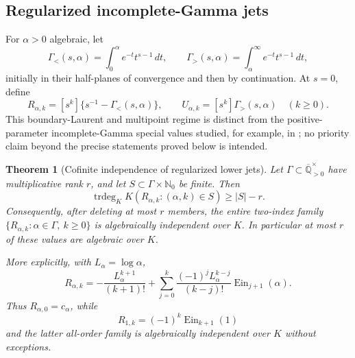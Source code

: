 \documentclass[11pt]{article}
\newtheorem{theorem}{Theorem}[section]
\theoremstyle{definition}
\theoremstyle{remark}
\newcommand{\Qbar}{\overline{\mathbb Q}}
\newcommand{\N}{\mathbb N}
\newcommand{\Ein}{\operatorname{Ein}}
\newcommand{\trdeg}{\operatorname{trdeg}}
\begin{document}
\subsection*{Regularized incomplete-Gamma jets}

For \(\alpha>0\) algebraic, let
\[
 \Gamma_{<}(s,\alpha)=\int_0^\alpha e^{-t}t^{s-1}\,dt,
 \qquad
 \Gamma_{>}(s,\alpha)=\int_\alpha^\infty e^{-t}t^{s-1}\,dt,
\]
initially in their half-planes of convergence and then by continuation.
At \(s=0\), define
\begin{equation}\label{eq:incomplete-gamma-jets}
 R_{\alpha,k}=[s^k]\{s^{-1}-\Gamma_{<}(s,\alpha)\},
 \qquad
 U_{\alpha,k}=[s^k]\Gamma_{>}(s,\alpha)
 \quad(k\ge0).
\end{equation}
This boundary-Laurent and multipoint regime is distinct from the
positive-parameter incomplete-Gamma special values studied, for example,
in \cite{MurtySaha2015}; no priority claim beyond the precise statements
proved below is intended.

\begin{theorem}[Cofinite independence of regularized lower jets]
\label{thm:lower-gamma-jets}
Let \(\Gamma\subset\Qbar_{>0}^{\times}\) have multiplicative rank \(r\),
and let \(S\subset\Gamma\times\N_0\) be finite.  Then
\begin{equation}\label{eq:lower-gamma-jet-defect}
 \boxed{\displaystyle
 \trdeg_KK(R_{\alpha,k}:(\alpha,k)\in S)\ge |S|-r.}
\end{equation}
Consequently, after deleting at most \(r\) members, the entire two-index
family \(\{R_{\alpha,k}:\alpha\in\Gamma,\ k\ge0\}\) is algebraically
independent over \(K\).  In particular at most \(r\) of these values are
algebraic over \(K\).

More explicitly, with \(L_\alpha=\log\alpha\),
\begin{equation}\label{eq:lower-gamma-jet-explicit}
 R_{\alpha,k}=-\frac{L_\alpha^{k+1}}{(k+1)!}
 +\sum_{j=0}^k\frac{(-1)^jL_\alpha^{k-j}}{(k-j)!}
 \Ein_{j+1}(\alpha).
\end{equation}
Thus \(R_{\alpha,0}=c_\alpha\), while
\begin{equation}\label{eq:lower-gamma-at-one}
 R_{1,k}=(-1)^k\Ein_{k+1}(1)
\end{equation}
and the latter all-order family is algebraically independent over \(K\)
without exceptions.
\end{theorem}
\end{document}
